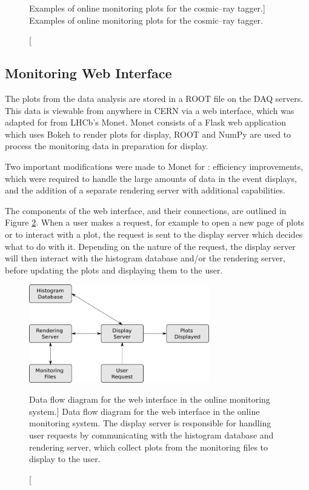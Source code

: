\begin{figure}
	\caption
	[Examples of online monitoring plots for the cosmic--ray tagger.]
	{Examples of online monitoring plots for the cosmic--ray tagger.}
	\label{fig:crt_OM}

\end{figure}

\subsection{Monitoring Web Interface}
The plots from the data analysis are stored in a ROOT file on the \protodune{}
DAQ servers. This data is viewable from anywhere in CERN via a web interface,
which was adapted for \protodune{} from LHCb's Monet\cite{Adinolfi_2017}. 
Monet consists of a Flask web application\cite{flask} which uses 
Bokeh\cite{bokeh} to render plots for display, ROOT\cite{ANTCHEVA20092499} and 
NumPy\cite{numpy} are used to process the monitoring data in preparation for 
display.

Two important modifications were made to Monet for \protodune{}: efficiency 
improvements, which were required to handle the large amounts of data in the 
event displays, and the addition of a separate rendering server with 
additional capabilities. 

The components of the web interface, and their connections, are outlined in 
Figure \ref{fig:monet_flow}. When a user makes a request, for example to open 
a new page of plots or to interact with a plot, the request is sent to the 
display server which decides what to do with it. Depending on the nature of 
the request, the display server will then interact with the histogram database 
and/or the rendering server, before updating the plots and displaying them to 
the user. 

\begin{figure}

	\centering

	\includegraphics[width=0.7\textwidth]{figures/monet_flow.png}

	\caption
	[Data flow diagram for the web interface in the \protodune{} online 
	monitoring system.] 
	{Data flow diagram for the web interface in the \protodune{} online 
	monitoring system. The display server is responsible for handling user
	requests by communicating with the histogram database and rendering server,
	which collect plots from the monitoring files to display to the user.} 
	\label{fig:monet_flow}

\end{figure}

